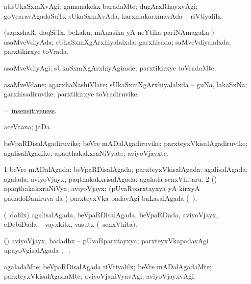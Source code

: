 \bentry
{}
\gl{\kirxvi}
\bmng
atisUkaSxmXvAgi; gamanakekx baradaMte; dugArxRhayxvAgi; goVcaravAgadaSuTx sUkaSxmXvAda, karxmakarxmavAda -- riVtiyalilx. 
\emng
\eentry

\bentry
{}
\gl{\gu}
\bmng
(sapxshaR, daqSiTx, beLaku, mAnasika yA neYtika pariNAmagaLa \vi) asaMveVdiyAda; sUkaSxmXgArxhiyalalxda; garxhisada; saMveVdiyalalxda; parxtikirxye toVrada. 
\emng
\eentry

\bentry
{}
\gl{\kirxvi}
\bmng
asaMveVdiyAgi; sUkaSxmXgArxhiyAgirade; parxtikirxye toVradaMte. 
\emng
\eentry

\bentry
{}
\gl{\nA}
\bmng
asaMveVdane; agarxhaNashiVlate; sUkaSxmXgArxhiyalalxda -- guNa, lakaSxNa; garxhisadiruvike; parxtikirxye toVradiruvike. 
\emng
\eentry

\bentry
{}
\gl{\nA}
\bmng
= \hyperlink{insensitiveness}{insensitiveness}. 
\emng
\eentry

\bentry
{}
\gl{\gu}
\bmng
aceVtana; jaDa. 
\emng
\eentry

\bentry
{}
\gl{\nA}
\bmng
beVpaRDisalAgadiruvike; beVre mADalAgadiruvike; parxteyxVkisalAgadiruvike; agalisalAgadike; apaqthakakxraNiVyate; aviyoVjayxte. 
\emng
\eentry

\bentry
{}
\gl{\gu}
\bmng
\bnum
\num{1} beVre mADalAgada; beVpaRDisalAgada; parxteyxVkisalAgada; agalisalAgada; agalada; aviyoVjayx; paqthakakxrisalAgada:  agalada senxVhitaru. 
\num{2} (\vAyx) apaqthakakxraNiVya; aviyoVjayx; (pUvaRparxtayxya yA kirxyA padadoDaniruva \pUparx da \vi) parxteyxVka padavAgi baLasalAgada (\udA\ ). 
\enum
\emng
\eentry

\bentry
{}
\gl{\nA}
\bmng
(\sA\ \bava dalilx) agalisalAgada, beVpaRDisalAgada, beVpaRDada, aviyoVjayx, eDebiDada -- vayxkitx, vasutx (\kanmu\ senxVhita). 
\emng
\eentry

\bentry
{}
\gl{\nA}
\bmng
(\vAyx) aviyoVjayx, badadhx -- pUvaRparxtayxya; parxteyxVkapadavAgi upayoVgisalAgada \pUparx, \udA\ . 
\emng
\eentry

\bentry
{}
\gl{\kirxvi}
\bmng
agaladaMte; beVpaRDisalAgada riVtiyalilx; beVre mADalAgadaMte; parxteyxVkisalAgadaMte; aviyoVjaniVyavAgi; aviyoVjayxvAgi. 
\emng
\eentry

